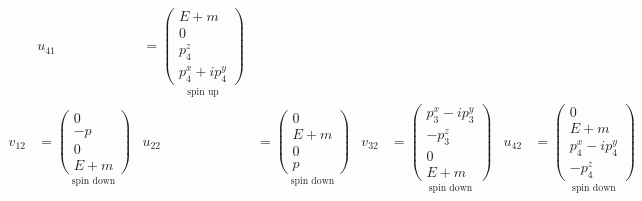 \documentclass[12pt]{article}
\begin{document}
\begin{align*}
{}
&
u_{41}&=
\underset{\text{spin up}}
{
\begin{pmatrix}E+m\\0\\p_4^z\\p_4^x+ip_4^y\end{pmatrix}
}
\\[1ex]
v_{12}&=
\underset{\text{spin down}}
{
\begin{pmatrix}0\\-p\\0\\E+m\end{pmatrix}
}
&
u_{22}&=
\underset{\text{spin down}}
{
\begin{pmatrix}0\\E+m\\0\\p\end{pmatrix}
}
&
v_{32}&=
\underset{\text{spin down}}
{
\begin{pmatrix}p_3^x-ip_3^y\\-p_3^z\\0\\E+m\end{pmatrix}
}
&
u_{42}&=
\underset{\text{spin down}}
{
\begin{pmatrix}0\\E+m\\p_4^x-ip_4^y\\-p_4^z\end{pmatrix}
}
\end{align*}
\else
\end{document}
